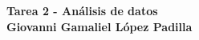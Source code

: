 \begin{center}
    \textbf{
        \textcolor{title}{Tarea 2 - Análisis de datos\vspace{0.2cm}\\
            Giovanni Gamaliel López Padilla}}
\end{center}
